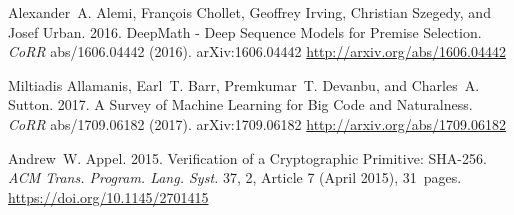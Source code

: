 \documentclass[sigplan,screen]{acmart}
\renewcommand{\>}{\quad}
\begin{document}
\begin{thebibliography}{41}



\ifx \showCODEN    \undefined {}     \fi
\ifx \showDOI      \undefined \def \showDOI       #1{#1}\fi
\ifx \showISBNx    \undefined \def \showISBNx     #1{\unskip}     \fi
\ifx \showISBNxiii \undefined \def \showISBNxiii  #1{\unskip}     \fi
\ifx \showISSN     \undefined \def \showISSN      #1{\unskip}     \fi
\ifx \showLCCN     \undefined \def \showLCCN      #1{\unskip}     \fi
\ifx \shownote     \undefined \def \shownote      #1{#1}          \fi
\ifx \showarticletitle \undefined \def \showarticletitle #1{#1}   \fi
\ifx \showURL      \undefined \def \showURL       {\relax}        \fi
\providecommand\bibfield[2]{#2}
\providecommand\bibinfo[2]{#2}
\providecommand\natexlab[1]{#1}
\providecommand\showeprint[2][]{arXiv:#2}

\bibfield{author}{\bibinfo{person}{Alexander~A. Alemi},
  \bibinfo{person}{Fran{\c{c}}ois Chollet}, \bibinfo{person}{Geoffrey Irving},
  \bibinfo{person}{Christian Szegedy}, {and} \bibinfo{person}{Josef Urban}.}
  \bibinfo{year}{2016}\natexlab{}.
\newblock \showarticletitle{DeepMath - Deep Sequence Models for Premise
  Selection}.
\newblock \bibinfo{journal}{\emph{CoRR}}  \bibinfo{volume}{abs/1606.04442}
  (\bibinfo{year}{2016}).
\newblock
\showeprint[arxiv]{1606.04442}
\urldef\tempurl \url{http://arxiv.org/abs/1606.04442}
\showURL{\tempurl}


\bibfield{author}{\bibinfo{person}{Miltiadis Allamanis},
  \bibinfo{person}{Earl~T. Barr}, \bibinfo{person}{Premkumar~T. Devanbu}, {and}
  \bibinfo{person}{Charles~A. Sutton}.} \bibinfo{year}{2017}\natexlab{}.
\newblock \showarticletitle{A Survey of Machine Learning for Big Code and
  Naturalness}.
\newblock \bibinfo{journal}{\emph{CoRR}}  \bibinfo{volume}{abs/1709.06182}
  (\bibinfo{year}{2017}).
\newblock
\showeprint[arxiv]{1709.06182}
\urldef\tempurl \url{http://arxiv.org/abs/1709.06182}
\showURL{\tempurl}


\bibfield{author}{\bibinfo{person}{Andrew~W. Appel}.}
  \bibinfo{year}{2015}\natexlab{}.
\newblock \showarticletitle{Verification of a Cryptographic Primitive:
  SHA-256}.
\newblock \bibinfo{journal}{\emph{ACM Trans. Program. Lang. Syst.}}
  \bibinfo{volume}{37}, \bibinfo{number}{2}, Article \bibinfo{articleno}{7}
  (\bibinfo{date}{April} \bibinfo{year}{2015}), \bibinfo{numpages}{31}~pages.
\newblock
\showISSN{0164-0925}
\urldef\tempurl \url{https://doi.org/10.1145/2701415}
\showDOI{\tempurl}



\end{thebibliography}
\end{document}

